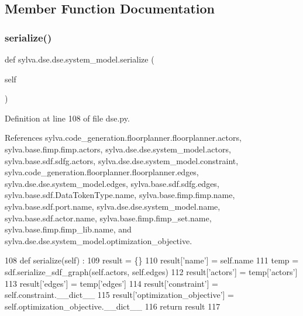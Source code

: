 \subsection{Member Function Documentation}
\mbox{\label{classsylva_1_1dse_1_1dse_1_1system__model_abdbd324e6d87f3baef25aeab12444edc}} 
\subsubsection{\texorpdfstring{serialize()}{serialize()}}
{\footnotesize\ttfamily def sylva.\+dse.\+dse.\+system\+\_\+model.\+serialize (\begin{DoxyParamCaption}\item[{}]{self }\end{DoxyParamCaption})}



Definition at line 108 of file dse.\+py.



References sylva.\+code\+\_\+generation.\+floorplanner.\+floorplanner.\+actors, sylva.\+base.\+fimp.\+fimp.\+actors, sylva.\+dse.\+dse.\+system\+\_\+model.\+actors, sylva.\+base.\+sdf.\+sdfg.\+actors, sylva.\+dse.\+dse.\+system\+\_\+model.\+constraint, sylva.\+code\+\_\+generation.\+floorplanner.\+floorplanner.\+edges, sylva.\+dse.\+dse.\+system\+\_\+model.\+edges, sylva.\+base.\+sdf.\+sdfg.\+edges, sylva.\+base.\+sdf.\+Data\+Token\+Type.\+name, sylva.\+base.\+fimp.\+fimp.\+name, sylva.\+base.\+sdf.\+port.\+name, sylva.\+dse.\+dse.\+system\+\_\+model.\+name, sylva.\+base.\+sdf.\+actor.\+name, sylva.\+base.\+fimp.\+fimp\+\_\+set.\+name, sylva.\+base.\+fimp.\+fimp\+\_\+lib.\+name, and sylva.\+dse.\+dse.\+system\+\_\+model.\+optimization\+\_\+objective.


\begin{DoxyCode}
108   \textcolor{keyword}{def }serialize(self) :
109     result = \{\}
110     result[\textcolor{stringliteral}{'name'}] = self.name
111     temp = sdf.serialize\_sdf\_graph(self.actors, self.edges)
112     result[\textcolor{stringliteral}{'actors'}] = temp[\textcolor{stringliteral}{'actors'}]
113     result[\textcolor{stringliteral}{'edges'}] = temp[\textcolor{stringliteral}{'edges'}]
114     result[\textcolor{stringliteral}{'constraint'}] = self.constraint.\_\_dict\_\_
115     result[\textcolor{stringliteral}{'optimization\_objective'}] = self.optimization\_objective.\_\_dict\_\_
116     \textcolor{keywordflow}{return} result
117 
\end{DoxyCode}



